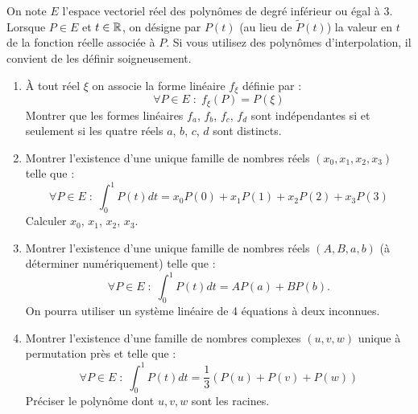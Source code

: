 On note $E$ l'espace vectoriel réel des polynômes de degré inférieur ou égal à 3. Lorsque $P\in E$ et $t\in\mathbb{R}$, on désigne par $P(t)$ (au lieu de $\widetilde{P}(t)$) la valeur en $t$ de la fonction réelle associée à $P$.\newline
Si vous utilisez des polynômes d'interpolation, il convient de les définir soigneusement.
\begin{enumerate}
 \item \`A tout réel $\xi$ on associe la forme linéaire $f_\xi$ définie par :
\begin{displaymath}
 \forall P\in E \;:\; f_\xi(P)= P(\xi)
\end{displaymath}
Montrer que les formes linéaires $f_a$, $f_b$, $f_c$, $f_d$ sont indépendantes si et seulement si les quatre réels $a$, $b$, $c$, $d$ sont distincts.

\item Montrer l'existence d'une unique famille de nombres réels $(x_0, x_1, x_2, x_3)$ telle que :
\begin{displaymath}
\forall P\in E \;:\; \int_{0}^{1}P(t)dt = x_0P(0) + x_1P(1)+ x_2P(2) + x_3P(3)
\end{displaymath}
Calculer $x_0$, $x_1$, $x_2$, $x_3$.

\item Montrer l'existence d'une unique famille de nombres réels $(A, B, a, b)$ (à déterminer numériquement) telle que :
\begin{displaymath}
\forall P\in E \;:\; \int_{0}^{1}P(t)dt = AP(a) + BP(b).
\end{displaymath}
On pourra utiliser un système linéaire de 4 équations à deux inconnues.

\item Montrer l'existence d'une famille de  nombres complexes $(u, v, w)$ unique à permutation près et telle que :
\begin{displaymath}
\forall P\in E \;:\; \int_{0}^{1}P(t)dt = \dfrac{1}{3}(P(u) + P(v) +P(w))
\end{displaymath}
Préciser le polynôme dont $u,v,w$ sont les racines. 
\end{enumerate}
 